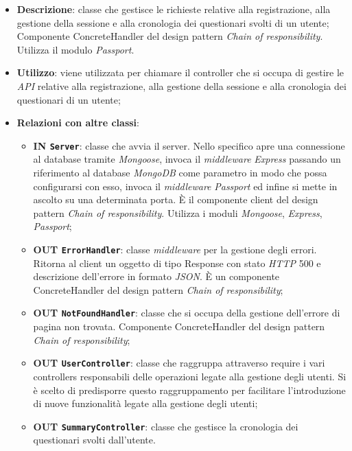	\begin{itemize}
		\item \textbf{Descrizione}: classe che gestisce le richieste relative alla registrazione, alla gestione della sessione e alla cronologia dei questionari svolti di un utente;
Componente ConcreteHandler del design pattern \textit{Chain of responsibility}. Utilizza il modulo \textit{Passport}.
		\item \textbf{Utilizzo}: viene utilizzata per chiamare il controller che si occupa di gestire le \textit{API} relative alla registrazione, alla gestione della sessione e alla cronologia dei questionari di un utente;
		\item \textbf{Relazioni con altre classi}:
		\begin{itemize}
		\item 
			\textbf{IN	\texttt{Server}}: classe che avvia il server. Nello specifico apre una connessione al database tramite \textit{Mongoose}, invoca il \textit{middleware} \textit{Express} passando un riferimento al database \textit{MongoDB} come parametro in modo che possa configurarsi con esso, invoca il \textit{middleware} \textit{Passport} ed infine si mette in ascolto su una determinata porta. È il componente client del design pattern \textit{Chain of responsibility}. Utilizza i moduli \textit{Mongoose}, \textit{Express}, \textit{Passport}; 
		\item 
		\textbf{	OUT \texttt{ErrorHandler}}: classe \textit{middleware} per la gestione degli errori. Ritorna al client un oggetto di tipo Response con stato \textit{HTTP} 500 e descrizione dell’errore in formato \textit{JSON}. È un
componente ConcreteHandler del design pattern \textit{Chain of responsibility};
		\item 
			\textbf{OUT \texttt{NotFoundHandler}}: classe che si occupa della gestione dell’errore di pagina non trovata. Componente ConcreteHandler del design pattern \textit{Chain of responsibility};
		\item 
			\textbf{OUT \texttt{UserController}}: classe che raggruppa attraverso require i vari controllers responsabili delle operazioni legate alla gestione degli utenti. Si è scelto di predisporre questo raggruppamento per facilitare l'introduzione di nuove funzionalità legate alla gestione degli utenti;
		\item 
		\textbf{	OUT \texttt{SummaryController}}: classe che gestisce la cronologia dei questionari svolti dall'utente.

\end{itemize}
\end{itemize}

